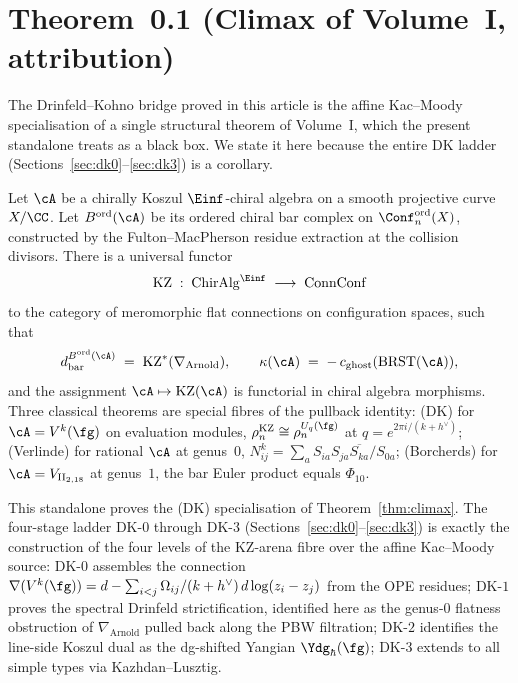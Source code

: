 \section*{Theorem~0.1 (Climax of Volume~I, attribution)}
\label{sec:dk-climax-attribution}

The Drinfeld--Kohno bridge proved in this article is the affine
Kac--Moody specialisation of a single structural theorem of
Volume~I, which the present standalone treats as a black box.
We state it here because the entire DK ladder
(Sections~\ref{sec:dk0}--\ref{sec:dk3}) is a corollary.

\begin{theorem}
\label{thm:climax}
Let $\cA$ be a chirally Koszul $\Einf$-chiral algebra on a smooth
projective curve $X / \CC$. Let $B^{\mathrm{ord}}(\cA)$ be its
ordered chiral bar complex on
$\Conf_{n}^{\mathrm{ord}}(X)$, constructed by the
Fulton--MacPherson residue extraction at the collision divisors.
There is a universal functor
\[
  \mathrm{KZ} \;:\; \mathrm{ChirAlg}^{\Einf}
  \;\longrightarrow\; \mathrm{ConnConf}
\]
to the category of meromorphic flat connections on configuration
spaces, such that
\[
  d_{\mathrm{bar}}^{B^{\mathrm{ord}}(\cA)}
  \;=\;
  \mathrm{KZ}^{*}(\nabla_{\mathrm{Arnold}}),
  \qquad
  \kappa(\cA) \;=\; -\,c_{\mathrm{ghost}}(\mathrm{BRST}(\cA)),
\]
and the assignment $\cA \mapsto \mathrm{KZ}(\cA)$ is functorial in
chiral algebra morphisms. Three classical theorems are special
fibres of the pullback identity:
\textup{(DK)} for $\cA = V^{k}(\fg)$ on evaluation modules,
$\rho_{n}^{\mathrm{KZ}} \cong \rho_{n}^{U_{q}(\fg)}$
at $q = e^{2\pi i/(k+h^{\vee})}$;
\textup{(Verlinde)} for rational $\cA$ at genus~$0$,
$N_{ij}^{k} = \sum_{a}S_{ia}S_{ja}\overline{S_{ka}}/S_{0a}$;
\textup{(Borcherds)} for $\cA = V_{\mathrm{II}_{2,18}}$ at genus~$1$,
the bar Euler product equals $\Phi_{10}$.
\ClaimStatusProvedElsewhere
\end{theorem}

\begin{remark}
\label{rem:dk-position-in-climax}
This standalone proves the (DK) specialisation of
Theorem~\ref{thm:climax}. The four-stage ladder DK-$0$ through
DK-$3$ (Sections~\ref{sec:dk0}--\ref{sec:dk3}) is exactly the
construction of the four levels of the
$\mathrm{KZ}$-arena fibre over the affine Kac--Moody source:
DK-$0$ assembles the connection
$\nabla(V^{k}(\fg)) = d - \sum_{i<j}\Omega_{ij}/(k+h^{\vee})\,
d\log(z_{i}-z_{j})$
from the OPE residues; DK-$1$ proves the spectral Drinfeld
strictification, identified here as the genus-$0$ flatness
obstruction of $\nabla_{\mathrm{Arnold}}$ pulled back along the
PBW filtration; DK-$2$ identifies the line-side Koszul dual as
the dg-shifted Yangian $\Ydg_{\hbar}(\fg)$;
DK-$3$ extends to all simple types via Kazhdan--Lusztig.
\end{remark}
